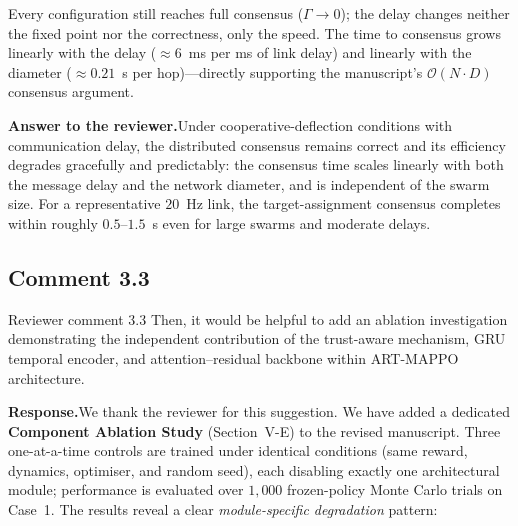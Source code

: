 \documentclass[11pt]{article}
\newcommand{\rsp}{\medskip\noindent\textbf{Response.}\quad}
\begin{document}
\noindent Every configuration still reaches full consensus ($\Gamma\!\to\!0$); the
delay changes neither the fixed point nor the correctness, only the speed. The time
to consensus grows linearly with the delay ($\approx6$~ms per ms of link delay) and
linearly with the diameter ($\approx0.21$~s per hop)---directly supporting the
manuscript's $\mathcal{O}(N\!\cdot\!D)$ consensus argument.

\medskip
\noindent\textbf{Answer to the reviewer.}\quad Under cooperative-deflection
conditions with communication delay, the distributed consensus remains correct and
its efficiency degrades gracefully and predictably: the consensus time scales
linearly with both the message delay and the network diameter, and is independent
of the swarm size. For a representative $20$~Hz link, the target-assignment
consensus completes within roughly $0.5$--$1.5$~s even for large swarms and moderate
delays.






\subsection*{Comment 3.3 }

\begin{reviewercomment}{Reviewer comment 3.3}
Then, it would be helpful to add an ablation investigation demonstrating the independent
contribution of the trust-aware mechanism, GRU temporal encoder, and attention--residual
backbone within ART-MAPPO architecture.
\end{reviewercomment}

\rsp We thank the reviewer for this suggestion.  We have added a dedicated
\textbf{Component Ablation Study} (Section~V-E) to the revised manuscript.
Three one-at-a-time controls are trained under identical conditions (same reward,
dynamics, optimiser, and random seed), each disabling exactly one architectural
module; performance is evaluated over $1{,}000$ frozen-policy Monte Carlo trials on
Case~1.  The results reveal a clear \emph{module-specific degradation} pattern:
\end{document}
